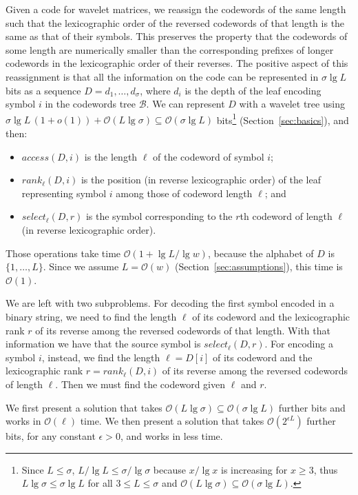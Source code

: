 \documentclass[preprint,12pt]{elsarticle}
\newcommand{\Oh}[1]{\ensuremath{\mathcal{O}\!\left({#1}\right)}}
\newcommand{\B}{\mathcal{B}}
\renewcommand{\log}{\lg}
\begin{document}
Given a code for wavelet matrices, we reassign the codewords of the same length such that the lexicographic order of the reversed codewords of that length is the same as that of their symbols. This preserves the property that the codewords
of some length are numerically smaller than the corresponding prefixes of 
longer codewords in the lexicographic order of their reverses. The positive
aspect of this reassignment is that all the information on the code can be 
represented in $\sigma\lg L$ bits as a sequence $D = d_1, \ldots, d_\sigma$, 
where $d_i$ is the depth of the leaf encoding symbol $i$ in the codewords tree 
$\B$. We can represent $D$ with a wavelet tree using $\sigma\lg L\,(1+o(1)) +
\Oh{L\lg\sigma} \subseteq \Oh{\sigma\lg L}$ bits\footnote{Since $L \le \sigma$, $L/\log L \le \sigma/\log\sigma$ because
$x/\lg x$ is increasing for $x \ge 3$, thus $L\lg \sigma \le \sigma\lg L$
for all $3 \le L \le \sigma$ and $\Oh{L\lg\sigma} \subseteq\Oh{\sigma\lg L}$.}
(Section~\ref{sec:basics}), and then:
\begin{itemize}
\item $access(D,i)$ is the length $\ell$ of the codeword of symbol $i$; 
\item $rank_\ell(D,i)$ is the position (in reverse lexicographic order) of the 
leaf representing symbol $i$ among those of codeword length $\ell$; and 
\item $select_\ell(D,r)$ is the symbol corresponding to the $r$th codeword 
of length $\ell$ (in reverse lexicographic order).
\end{itemize}

Those operations take time $\Oh{1+\lg L / \lg w}$, because the 
alphabet of $D$ is $\{1,\ldots,L\}$. Since we assume $L=\Oh{w}$ 
(Section~\ref{sec:assumptions}), this time is $\Oh{1}$.



We are left with two subproblems. For decoding the first symbol encoded in a binary string, we need to find the length $\ell$ of its codeword and the lexicographic rank $r$ of its reverse among the reversed codewords of that length. With that information we have that the source symbol is $select_\ell(D,r)$. For encoding a symbol $i$, instead, we find the length $\ell=D[i]$ of its codeword and the lexicographic rank $r=rank_\ell(D,i)$ of its reverse among the reversed codewords of length $\ell$. Then we must find the codeword given $\ell$ and $r$. 

We first present a solution that takes $\Oh{L \log \sigma} \subseteq \Oh{\sigma\log L}$ further bits and works in $\Oh{\ell}$ time. We then present a solution that takes $\Oh{2^{\epsilon L}}$ further bits, for any constant $\epsilon>0$,
 and works in less time.
\end{document}
